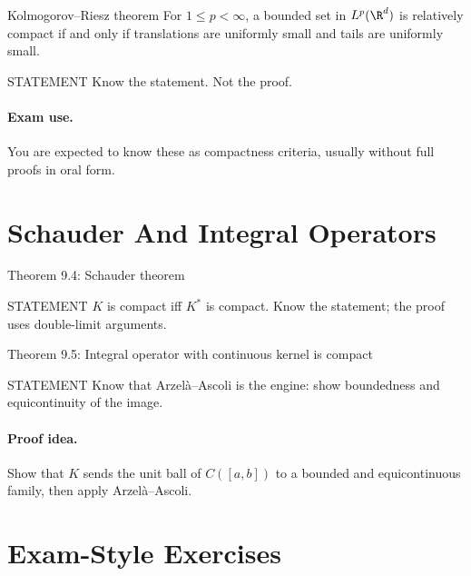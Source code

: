 \documentclass[header={Lecture 7 Exam Study Notes}]{study-note}
\begin{document}
\begin{thmbox}{Kolmogorov--Riesz theorem}
For $1\le p<\infty$, a bounded set in $L^p(\R^d)$ is relatively compact if and only if translations are uniformly small and tails are uniformly small.
\end{thmbox}

\begin{prooflevelbox}{STATEMENT}
Know the statement. Not the proof.
\end{prooflevelbox}

\paragraph{Exam use.}
You are expected to know these as compactness criteria, usually without full proofs in oral form.

\section{Schauder And Integral Operators}

\begin{thmbox}{Theorem 9.4: Schauder theorem}
\thmSchauder
\end{thmbox}

\begin{prooflevelbox}{STATEMENT}
$K$ is compact iff $K^*$ is compact. Know the statement; the proof uses double-limit arguments.
\end{prooflevelbox}

\begin{thmbox}{Theorem 9.5: Integral operator with continuous kernel is compact}
\thmIntegralOperator
\end{thmbox}

\begin{prooflevelbox}{STATEMENT}
Know that Arzel\`a--Ascoli is the engine: show boundedness and equicontinuity of the image.
\end{prooflevelbox}

\paragraph{Proof idea.}
Show that $K$ sends the unit ball of $C([a,b])$ to a bounded and equicontinuous family, then apply Arzel\`a--Ascoli.

\section{Exam-Style Exercises}
\end{document}
